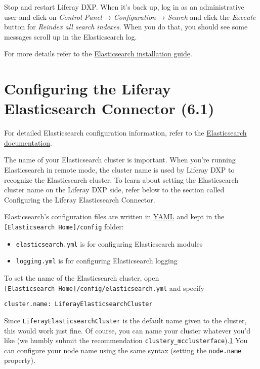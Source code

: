 Stop and restart Liferay DXP. When it's back up, log in as an
administrative user and click on \emph{Control Panel} →
\emph{Configuration} → \emph{Search} and click the \emph{Execute} button
for \emph{Reindex all search indexes}. When you do that, you should see
some messages scroll up in the Elasticsearch log.

For more details refer to the
\href{https://www.elastic.co/guide/en/elasticsearch/reference/6.1/_installation.html}{Elasticsearch
installation guide}.

\section{Configuring the Liferay Elasticsearch Connector
(6.1)}\label{configuring-the-liferay-elasticsearch-connector-6.1}

For detailed Elasticsearch configuration information, refer to the
\href{https://www.elastic.co/guide/en/elasticsearch/reference/6.1/settings.html}{Elasticsearch
documentation}.

The name of your Elasticsearch cluster is important. When you're running
Elasticsearch in remote mode, the cluster name is used by Liferay DXP to
recognize the Elasticsearch cluster. To learn about setting the
Elasticsearch cluster name on the Liferay DXP side, refer below to the
section called Configuring the Liferay Elasticsearch Connector.

Elasticsearch's configuration files are written in
\href{http://www.yaml.org}{YAML} and kept in the
\texttt{{[}Elasticsearch\ Home{]}/config} folder:

\begin{itemize}
\tightlist
\item
  \texttt{elasticsearch.yml} is for configuring Elasticsearch modules
\item
  \texttt{logging.yml} is for configuring Elasticsearch logging
\end{itemize}

To set the name of the Elasticsearch cluster, open
\texttt{{[}Elasticsearch\ Home{]}/config/elasticsearch.yml} and specify

\begin{verbatim}
cluster.name: LiferayElasticsearchCluster
\end{verbatim}

Since \texttt{LiferayElasticsearchCluster} is the default name given to
the cluster, this would work just fine. Of course, you can name your
cluster whatever you'd like (we humbly submit the recommendation
\texttt{clustery\_mcclusterface}).\hyperref[footnote1]{1} You can
configure your node name using the same syntax (setting the
\texttt{node.name} property).

